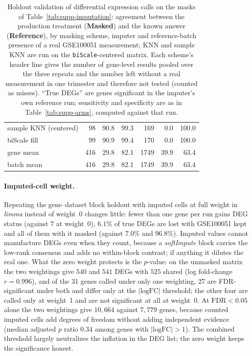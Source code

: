 \documentclass[11pt,a4paper]{article}
\begin{document}
\begin{table}[htbp]
\begin{tabular}{@{}lrrrrrr@{}}
sample KNN (centered) & 98 & 90.8 & 99.3 & 169 & 0.0 & 100.0 \\
biScale fill & 99 & 90.9 & 99.4 & 170 & 0.0 & 100.0 \\
gene mean & 416 & 29.8 & 82.1 & 1749 & 39.9 & 63.4 \\
batch mean & 416 & 29.8 & 82.1 & 1749 & 39.9 & 63.4 \\
\bottomrule
\end{tabular}
\caption{Holdout validation of differential expression calls on
  the masks of Table~\ref{tab:supp-imputation}: agreement between
  the production treatment (\textbf{Masked}) and the known answer
  (\textbf{Reference}), by masking scheme, imputer and reference-batch
  presence of a real GSE100051 measurement; KNN and sample KNN are run on the
  \texttt{biScale}-centered matrix. Each scheme's header line gives the number of
  gene-level results pooled over the three repeats and the number
  left without a real measurement in one trimester and therefore
  not tested (counted as misses). ``True DEGs'' are genes significant in the
  imputer's own reference run; sensitivity and specificity are
  as in Table~\ref{tab:supp-arms}, computed against that run.}
\label{tab:supp-blockholdout}
\end{table}

\paragraph{Imputed-cell weight.}
Repeating the gene--dataset block holdout with imputed cells at
full weight in \textit{limma} instead of weight~0 changes little:
fewer than one gene per run gains DEG status (against $7$ at
weight~0), $6.1\%$ of true DEGs are lost with GSE100051 kept
and all of them with it masked (against $7.0\%$ and $96.8\%$).
Imputed values cannot manufacture DEGs even when they count,
because a \textit{softImpute} block carries the low-rank
consensus and adds no within-block contrast; if anything it
dilutes the real one. What the zero weight protects is the
$p$-value: on the unmasked matrix the two weightings give
$540$ and $541$ DEGs with $525$ shared (log fold-change
$r = 0.996$), and of the 31 genes called under only one
weighting, 27 are FDR-significant under both and differ only at
the $|\text{logFC}|$ threshold; the other four are called only at
weight~1 and are not significant at all at weight~0. At
$\text{FDR} < 0.05$ alone the two weightings give $10{,}664$
against $7{,}779$ genes, because counted imputed cells add
degrees of freedom without adding independent evidence (median
adjusted $p$ ratio $0.34$ among genes with
$|\text{logFC}| > 1$). The combined threshold largely neutralizes
the inflation in the DEG list; the zero weight keeps the
significance honest.
\end{document}
